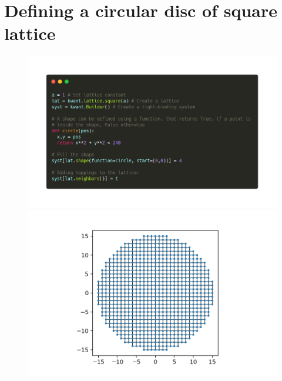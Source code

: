 \documentclass[12pt]{article}
\numberwithin{equation}{section}
\begin{document}
\newpage
\section*{Defining a circular disc of square lattice}
\begin{figure}[h!]
  \centering
  \begin{minipage}{0.49\textwidth}
    \centering
    \includegraphics[width=1.0\textwidth]{./media/example-circle-code.png} %
\end{minipage}\hfill
  \begin{minipage}{0.49\textwidth}
      \centering
      \includegraphics[width=1.0\textwidth]{./media/example-circle.png} %
  \end{minipage}
\end{figure}


\newpage
\end{document}
